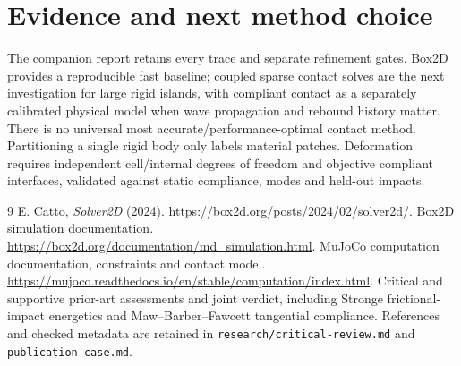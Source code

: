 \documentclass[11pt]{article}
\begin{document}
\section{Evidence and next method choice}
The companion report retains every trace and separate refinement gates.
Box2D provides a reproducible fast baseline; coupled sparse contact solves are
the next investigation for large rigid islands, with compliant contact as a
separately calibrated physical model when wave propagation and rebound history
matter. There is no universal most accurate/performance-optimal contact method.
Partitioning a single rigid body only labels material patches. Deformation
requires independent cell/internal degrees of freedom and objective compliant
interfaces, validated against static compliance, modes and held-out impacts.

\begin{thebibliography}{9}
 E. Catto, \emph{Solver2D} (2024).
\url{https://box2d.org/posts/2024/02/solver2d/}.
 Box2D simulation documentation.
\url{https://box2d.org/documentation/md_simulation.html}.
 MuJoCo computation documentation, constraints and contact model.
\url{https://mujoco.readthedocs.io/en/stable/computation/index.html}.
 Critical and supportive prior-art assessments and joint verdict,
including Stronge frictional-impact energetics and Maw--Barber--Fawcett
tangential compliance. References and checked metadata are retained in
\texttt{research/critical-review.md} and \texttt{publication-case.md}.
\end{thebibliography}
\end{document}
